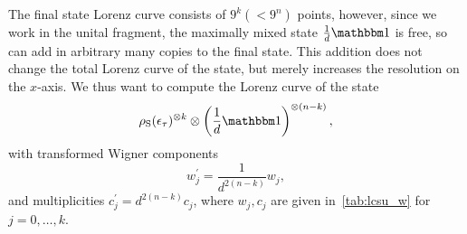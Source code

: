 \documentclass[pra,
aps,
twocolumn,
superscriptaddress,
groupedaddress,
nofootinbib,
reprint
]{revtex4-1}
\begin{document}
The final state Lorenz curve consists of $9^k (< 9^n)$ points, however, since we work in the unital fragment, the maximally mixed state $\frac{1}{d}\id$ is free, so can add in arbitrary many copies to the final state. 
This addition does not change the total Lorenz curve of the state, but merely increases the resolution on the $x$-axis. 
We thus want to compute the Lorenz curve of the state
\begin{equation}
\rho_{\rm{S}}(\epsilon_{\tau})^{\otimes k} \otimes \left( \frac{1}{d}\id\right)^{\otimes(n-k)},
\end{equation}
with transformed Wigner components 
\begin{equation}
w_j^\prime = \frac{1}{d^{2(n-k)}}w_j,
\end{equation}
and multiplicities $c_j^\prime = d^{2(n-k)}c_j$, where $w_j, c_j$ are given in~\cref{tab:lcsu_w} for $j=0,\dots,k$. 
 
\end{document}
